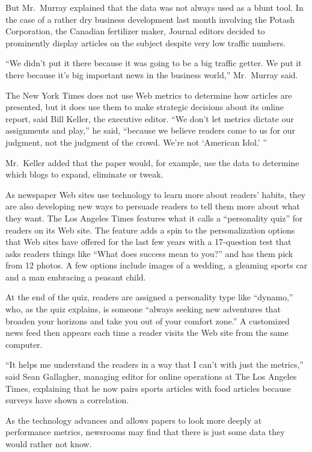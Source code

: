 ﻿\documentclass[12pt]{article}
\begin{document}
But Mr.~Murray explained that the data was not always used as a blunt tool. In the case of a rather
dry business development last month involving the Potash Corporation, the Canadian fertilizer maker,
Journal editors decided to prominently display articles on the subject despite very low traffic
numbers.

``We didn't put it there because it was going to be a big traffic getter. We put it there because
it's big important news in the business world,'' Mr.~Murray said.

The New York Times does not use Web metrics to determine how articles are presented, but it does use
them to make strategic decisions about its online report, said Bill Keller, the executive editor.
``We don't let metrics dictate our assignments and play,'' he said, ``because we believe readers
come to us for our judgment, not the judgment of the crowd. We're not `American Idol.' ''

Mr.~Keller added that the paper would, for example, use the data to determine which blogs to expand,
eliminate or tweak.

As newspaper Web sites use technology to learn more about readers' habits, they are also developing
new ways to persuade readers to tell them more about what they want. The Los Angeles Times features
what it calls a ``personality quiz'' for readers on its Web site. The feature adds a spin to the
personalization options that Web sites have offered for the last few years with a 17-question test
that asks readers things like ``What does success mean to you?'' and has them pick from 12 photos. A
few options include images of a wedding, a gleaming sports car and a man embracing a peasant child.

At the end of the quiz, readers are assigned a personality type like ``dynamo,'' who, as the quiz
explains, is someone ``always seeking new adventures that broaden your horizons and take you out of
your comfort zone.'' A customized news feed then appears each time a reader visits the Web site from
the same computer.

``It helps me understand the readers in a way that I can't with just the metrics,'' said Sean
Gallagher, managing editor for online operations at The Los Angeles Times, explaining that he now
pairs sports articles with food articles because surveys have shown a correlation.

As the technology advances and allows papers to look more deeply at performance metrics, newsrooms
may find that there is just some data they would rather not know.
\end{document}
